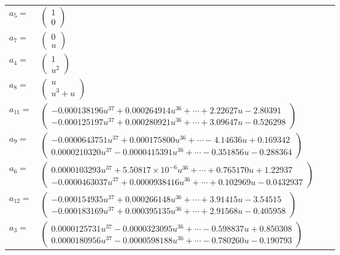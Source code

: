 \documentclass[1p]{elsarticle_modified}
\theoremstyle{definition}
\begin{document}
\begin{tabular}{m{7pt} m{180pt} m{7pt} m{180pt} }
\flushright $a_{5}=$&$\begin{pmatrix}1\\0\end{pmatrix}$ \\
\flushright $a_{7}=$&$\begin{pmatrix}0\\u\end{pmatrix}$ \\
\flushright $a_{4}=$&$\begin{pmatrix}1\\u^2\end{pmatrix}$ \\
\flushright $a_{8}=$&$\begin{pmatrix}u\\u^3+u\end{pmatrix}$ \\
\flushright $a_{11}=$&$\begin{pmatrix}-0.000138196 u^{37}+0.000264914 u^{36}+\cdots+2.22627 u-2.80391\\-0.000125197 u^{37}+0.000280921 u^{36}+\cdots+3.09647 u-0.526298\end{pmatrix}$ \\
\flushright $a_{9}=$&$\begin{pmatrix}-0.0000643751 u^{37}+0.000175800 u^{36}+\cdots-4.14636 u+0.169342\\0.0000210320 u^{37}-0.0000415391 u^{36}+\cdots-0.351856 u-0.288364\end{pmatrix}$ \\
\flushright $a_{6}=$&$\begin{pmatrix}0.0000103293 u^{37}+5.50817\times10^{-6} u^{36}+\cdots+0.765170 u+1.22937\\-0.0000463037 u^{37}+0.0000938416 u^{36}+\cdots+0.102969 u-0.0432937\end{pmatrix}$ \\
\flushright $a_{12}=$&$\begin{pmatrix}-0.000154935 u^{37}+0.000266148 u^{36}+\cdots+3.91415 u-3.54515\\-0.000183169 u^{37}+0.000395135 u^{36}+\cdots+2.91568 u-0.405958\end{pmatrix}$ \\
\flushright $a_{3}=$&$\begin{pmatrix}0.0000125731 u^{37}-0.0000323095 u^{36}+\cdots-0.598837 u+0.850308\\0.0000180956 u^{37}-0.0000598188 u^{36}+\cdots-0.780260 u-0.190793\end{pmatrix}$ \\

\end{tabular}
\end{document}
